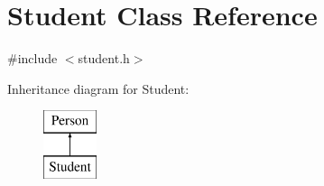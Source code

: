\hypertarget{class_student}{}\section{Student Class Reference}
\label{class_student}


{\ttfamily \#include $<$student.\+h$>$}

Inheritance diagram for Student\+:\begin{figure}[H]
\begin{center}
\leavevmode
\includegraphics[height=2.000000cm]{class_student}
\end{center}
\end{figure}
